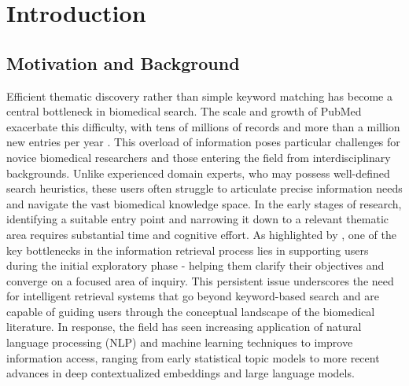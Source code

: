 \documentclass[utf8]{FrontiersinHarvard}
\begin{document}
\section{Introduction}
\label{sec:introduction}
\subsection{Motivation and Background}
Efficient thematic discovery rather than simple keyword matching has become a central bottleneck in biomedical search. The scale and growth of PubMed exacerbate this difficulty, with tens of millions of records and more than a million new entries per year \citep{jin_pubmed_2024}.
This overload of information poses particular challenges for novice biomedical researchers and those entering the field from interdisciplinary backgrounds. Unlike experienced domain experts, who may possess well-defined search heuristics, these users often struggle to articulate precise information needs and navigate the vast biomedical knowledge space. In the early stages of research, identifying a suitable entry point and narrowing it down to a relevant thematic area requires substantial time and cognitive effort. As highlighted by \citet{fu_designing_2020}, one of the key bottlenecks in the information retrieval process lies in supporting users during the initial exploratory phase - helping them clarify their objectives and converge on a focused area of inquiry. This persistent issue underscores the need for intelligent retrieval systems that go beyond keyword-based search and are capable of guiding users through the conceptual landscape of the biomedical literature. In response, the field has seen increasing application of natural language processing (NLP) and machine learning techniques to improve information access, ranging from early statistical topic models to more recent advances in deep contextualized embeddings and large language models.
\end{document}
